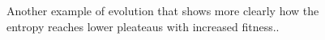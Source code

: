 \documentclass[11pt]{article}
\begin{document}
\begin{figure}[h!]
  \centering
  \caption{Another example of evolution that shows more clearly how
    the entropy reaches lower pleateaus with increased fitness..}
  \label{fig:gen-info_pid3027915}
\end{figure}
\end{document}
